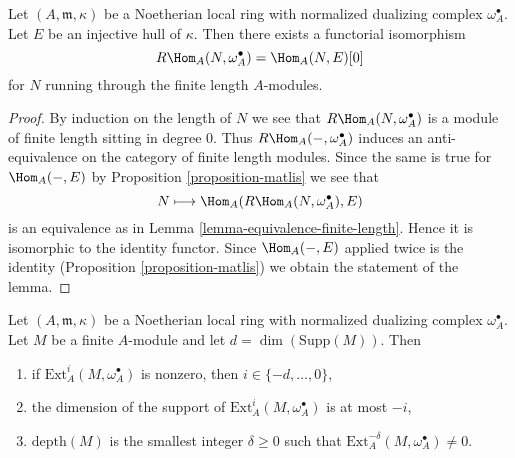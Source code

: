 \begin{lemma}
\label{lemma-dualizing-finite-length}
Let $(A, \mathfrak m, \kappa)$ be a Noetherian local
ring with normalized dualizing complex $\omega_A^\bullet$.
Let $E$ be an injective hull of $\kappa$. Then there exists
a functorial isomorphism
$$
R\Hom_A(N, \omega_A^\bullet) = \Hom_A(N, E)[0]
$$
for $N$ running through the finite length $A$-modules.
\end{lemma}

\begin{proof}
By induction on the length of $N$ we see that $R\Hom_A(N, \omega_A^\bullet)$
is a module of finite length sitting in degree $0$. Thus
$R\Hom_A(-, \omega_A^\bullet)$ induces an anti-equivalence
on the category of finite length modules. Since the same is true
for $\Hom_A(-, E)$ by Proposition \ref{proposition-matlis} we see that
$$
N \longmapsto \Hom_A(R\Hom_A(N, \omega_A^\bullet), E)
$$
is an equivalence as in Lemma \ref{lemma-equivalence-finite-length}.
Hence it is isomorphic to the identity functor.
Since $\Hom_A(-, E)$ applied twice is the identity
(Proposition \ref{proposition-matlis}) we obtain
the statement of the lemma.
\end{proof}

\begin{lemma}
\label{lemma-sitting-in-degrees}
Let $(A, \mathfrak m, \kappa)$ be a Noetherian local ring with
normalized dualizing complex $\omega_A^\bullet$. Let $M$ be a finite
$A$-module and let $d = \dim(\text{Supp}(M))$. Then
\begin{enumerate}
\item if $\text{Ext}^i_A(M, \omega_A^\bullet)$ is nonzero, then
$i \in \{-d, \ldots, 0\}$,
\item the dimension of the support of $\text{Ext}^i_A(M, \omega_A^\bullet)$
is at most $-i$,
\item $\text{depth}(M)$ is the smallest integer $\delta \geq 0$ such that
$\text{Ext}^{-\delta}_A(M, \omega_A^\bullet) \not = 0$.
\end{enumerate}
\end{lemma}

